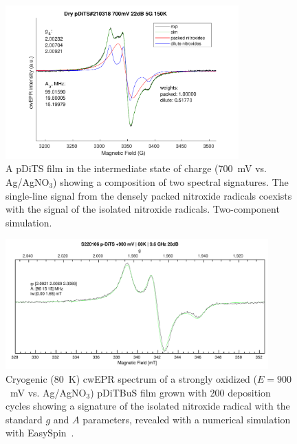 \begin{figure}[]
\center
	\includegraphics[width=0.8\textwidth]{./operando_epr/figures/CRYO/cw_sim_pDiTS_210318_700mV_2comp.pdf}
	\caption{A pDiTS film in the intermediate state of charge (700~mV vs. Ag/AgNO$_3$) showing a composition of two spectral signatures. The single-line signal from the densely packed nitroxide radicals coexists with the signal of the isolated nitroxide radicals. Two-component simulation.}
	\label{fig:cwEPR_CRYO_DiTS_2_COMP_SIM}
\end{figure}
\begin{figure}[h]
\center
	\includegraphics[width=0.9\textwidth]{./operando_epr/figures/CRYO/S220106_p-DiTS_OX_80K_CW_SIM.pdf}
	\caption{Cryogenic (80~K) cwEPR spectrum of a strongly oxidized ($E=900$~mV vs. Ag/AgNO$_3$) pDiTBuS film grown with 200 deposition cycles showing a signature of the isolated nitroxide radical with the standard $g$ and $A$ parameters, revealed with a numerical simulation with EasySpin~\cite{Stoll2006}.}
	\label{fig:cwEPR_CRYO_DiTBuS_CHG_SIM}
\end{figure}



